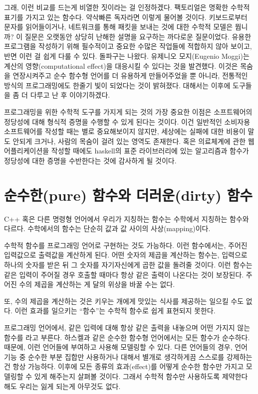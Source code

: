 그래, 이런 비교를 드는게 비열한 짓이라는 걸 인정하겠다. 팩토리얼은 명확한 수학적 표기를 가지고 있는 함수다. 약삭빠른 독자라면 이렇게 물어볼 것이다.
키보드로부터 문자를 읽어들이거나, 네트워크를 통해 패킷을 보내는 것에 대한 수학적 모델은 뭡니까? 이 질문은 오랫동안 상당히 난해한 설명을 요구하는 까다로운 질문이었다.
\trDenotationalSemantics\는 유용한 프로그램을 작성하기 위해 필수적이고 중요한 수많은 작업들에 적합하지 않아 보이고, 반면 \trOperationalSemantics\는 이런 걸 쉽게 다룰 수 있다.
돌파구는  나왔다. 유제니오 모지(Eugenio Moggi)는 계산의 영향(computational effect)을  대응시킬 수 있다는 것을 발견했다.
이것은  목숨을 연장시켜주고 순수 함수형 언어를 더 유용하게 만들어주었을 뿐 아니라, 전통적인 방식의 프로그래밍에도 한줄기 빛이 되었다는 것이 밝혀졌다.
 대해서는 이후에  도구들을 좀 더 다루고 난 후 이야기하겠다.

프로그래밍을 위한 수학적 도구를 가지게 되는 것의 가장 중요한 이점은 소프트웨어의 정당성에 대해 형식적 증명을 수행할 수 있게 된다는 것이다.
이건 일반적인 소비자용 소프트웨어를 작성할 때는 별로 중요해보이지 않지만, 세상에는 실패에 대한 비용이 말도 안되게 크거나, 사람의 목숨이 걸려 있는 영역도 존재한다.
혹은 의료체계에 관한 웹 어플리케이션을 작성할 때에도 haskell의 표준 라이브러리에 있는 알고리즘과 함수가 정당성에 대한 증명을 수반한다는 것에 감사하게 될 것이다.

\section{순수한(pure) 함수와 더러운(dirty) 함수}

C++ 혹은 다른 명령형 언어에서 우리가 지칭하는 함수는 수학에서 지칭하는 함수와 다르다. 수학에서의 함수는 단순히 값과 값 사이의 사상(mapping)이다.

수학적 함수를 프로그래밍 언어로 구현하는 것도 가능하다. 이런 함수에서는, 주어진 입력값으로 출력값을 계산하게 된다.
어떤 숫자의 제곱을 계산하는 함수는, 입력으로 하나의 숫자를 받은 뒤 그 숫자를 자기자신에게 곱한 값을 돌려줄 것이다.
이런 함수는 같은 입력이 주어질 경우 호출할 때마다 항상 같은 출력이 나온다는 것이 보장된다.
주어진 수의 제곱을 계산하는 게 달의 위상을 바꿀 수는 없다.

또, 수의 제곱을 계산하는 것은 키우는 개에게 맛있는 식사를 제공하는  일으킬 수도 없다. 이런 효과를 일으키는 ``함수''는 수학적 함수로 쉽게 표현되지 못한다.

프로그래밍 언어에서, 같은 입력에 대해 항상 같은 출력을 내놓으며 어떤  가지지 않는 함수를 라고 부른다.
하스켈과 같은 순수한 함수형 언어에서는 모든 함수가 순수하다. 때문에, 이런 언어들에  부여하고 \trCategoryTheory\를 사용해 모델링할 수 있다.
다른 언어들의 경우, 언어 기능 중 순수한 부분 집합만 사용하거나  대해서 별개로 생각하게끔 스스로를 강제하는건 항상 가능하다.
이후에  모든 종류의 효과(effect)를 어떻게 순수한 함수만 가지고 모델링할 수 있게 해주는지 살펴볼 것이다.
그래서 수학적 함수만 사용하도록 제약한다 해도 우리는 잃게 되는게 아무것도 없다.

